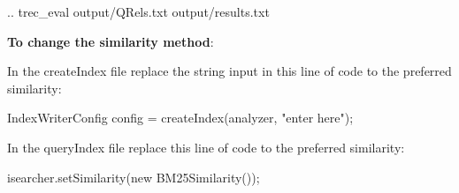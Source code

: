 \begin{center} 
.. trec\_eval output/QRels.txt output/results.txt \newline
\end{center}

\noindent \textbf{To change the similarity method}: 

\noindent In the createIndex file replace the string input in this line of code to the preferred similarity:
	
\begin{center} 
	IndexWriterConfig config =  createIndex(analyzer, "enter here"); \newline
\end{center}

\noindent In the queryIndex file replace this line of code to the preferred similarity: 

\begin{center} 
	isearcher.setSimilarity(new BM25Similarity()); \newline
\end{center}

